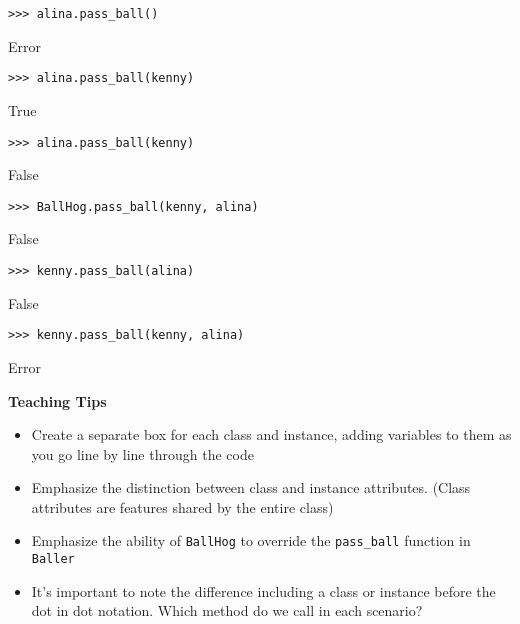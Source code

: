 \begin{blocksection}
\begin{lstlisting}
>>> alina.pass_ball()
\end{lstlisting}
\begin{solution}[.2in]
Error
\end{solution}

\begin{lstlisting}
>>> alina.pass_ball(kenny)
\end{lstlisting}
\begin{solution}[.2in]
True
\end{solution}

\begin{lstlisting}
>>> alina.pass_ball(kenny)
\end{lstlisting}
\begin{solution}[.2in]
False
\end{solution}

\begin{lstlisting}
>>> BallHog.pass_ball(kenny, alina)
\end{lstlisting}
\begin{solution}[.2in]
False
\end{solution}

\begin{lstlisting}
>>> kenny.pass_ball(alina)
\end{lstlisting}
\begin{solution}[.2in]
False
\end{solution}

\begin{lstlisting}
>>> kenny.pass_ball(kenny, alina)
\end{lstlisting}
\begin{solution}[.2in]
Error
\end{solution}

\begin{guide}
\textbf{Teaching Tips}
\begin{itemize}
  \item Create a separate box for each class and instance, adding variables to them as you go line by line through the code
  \item Emphasize the distinction between class and instance attributes. (Class attributes are features shared by the entire class)
  \item Emphasize the ability of \lstinline{BallHog} to override the \lstinline{pass_ball} function in \lstinline{Baller}
  \item It's important to note the difference including a class or instance before the dot in dot notation. Which method do we call in each scenario?
\end{itemize}
\end{guide}
\end{blocksection}
